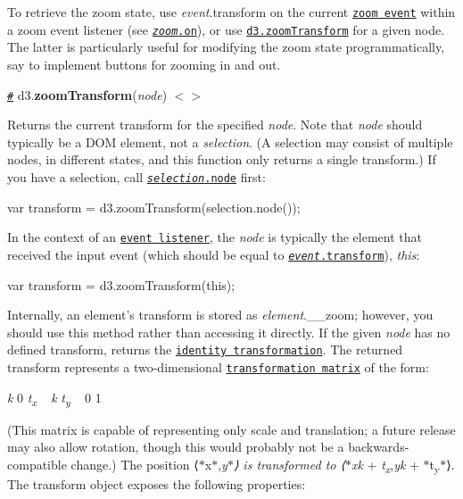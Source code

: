 To retrieve the zoom state, use {\itshape event}.transform on the current \href{#zoom-events}{\tt zoom event} within a zoom event listener (see \href{#zoom_on}{\tt {\itshape zoom}.on}), or use \href{#zoomTransform}{\tt d3.\+zoom\+Transform} for a given node. The latter is particularly useful for modifying the zoom state programmatically, say to implement buttons for zooming in and out.

\href{#zoomTransform}{\tt \#} d3.{\bfseries zoom\+Transform}({\itshape node}) \href{https://github.com/d3/d3-zoom/blob/master/src/transform.js}{\tt $<$$>$}

Returns the current transform for the specified {\itshape node}. Note that {\itshape node} should typically be a D\+OM element, not a {\itshape selection}. (A selection may consist of multiple nodes, in different states, and this function only returns a single transform.) If you have a selection, call \href{https://github.com/d3/d3-selection#selection_node}{\tt {\itshape selection}.node} first\+:


\begin{DoxyCode}
var transform = d3.zoomTransform(selection.node());
\end{DoxyCode}


In the context of an \href{https://github.com/d3/d3-selection#selection_on}{\tt event listener}, the {\itshape node} is typically the element that received the input event (which should be equal to \href{#zoom-events}{\tt {\itshape event}.transform}), {\itshape this}\+:


\begin{DoxyCode}
var transform = d3.zoomTransform(this);
\end{DoxyCode}


Internally, an element’s transform is stored as {\itshape element}.\+\_\+\+\_\+zoom; however, you should use this method rather than accessing it directly. If the given {\itshape node} has no defined transform, returns the \href{#zoomIdentity}{\tt identity transformation}. The returned transform represents a two-\/dimensional \href{https://en.wikipedia.org/wiki/Transformation_matrix#Affine_transformations}{\tt transformation matrix} of the form\+:

{\itshape k} 0 {\itshape t\textsubscript{x}} ~ {\itshape k} {\itshape t\textsubscript{y}} ~ 0 1

(This matrix is capable of representing only scale and translation; a future release may also allow rotation, though this would probably not be a backwards-\/compatible change.) The position ⟨$\ast$x$\ast$,{\itshape y$\ast$⟩ is transformed to ⟨$\ast$xk} + {\itshape t\textsubscript{x}},{\itshape yk} + $\ast$t\textsubscript{y}$\ast$⟩. The transform object exposes the following properties\+:


